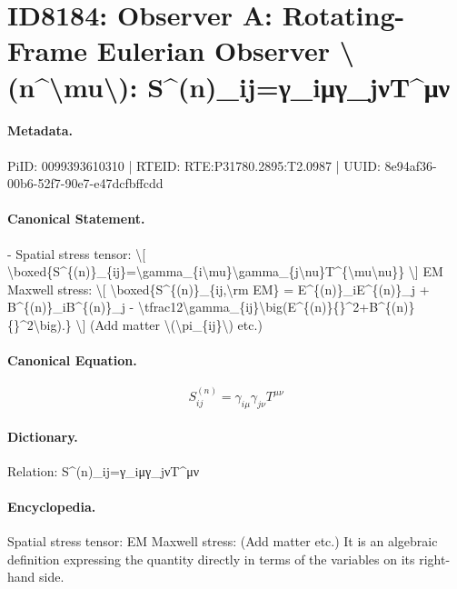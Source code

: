 \section*{ID8184: Observer A: Rotating-Frame Eulerian Observer \textbackslash{}(n\textasciicircum{}\textbackslash{}mu\textbackslash{}): S\textasciicircum{}(n)\_ij=γ\_iμγ\_jνT\textasciicircum{}μν}
\paragraph{Metadata.}
PiID: 0099393610310 | RTEID: RTE:P31780.2895:T2.0987 | UUID: 8e94af36-00b6-52f7-90e7-e47dcfbffcdd

\paragraph{Canonical Statement.}
- Spatial stress tensor: \textbackslash{}[ \textbackslash{}boxed\{S\textasciicircum{}\{(n)\}\_\{ij\}=\textbackslash{}gamma\_\{i\textbackslash{}mu\}\textbackslash{}gamma\_\{j\textbackslash{}nu\}T\textasciicircum{}\{\textbackslash{}mu\textbackslash{}nu\}\} \textbackslash{}] EM Maxwell stress: \textbackslash{}[ \textbackslash{}boxed\{S\textasciicircum{}\{(n)\}\_\{ij,\textbackslash{}rm EM\} = E\textasciicircum{}\{(n)\}\_iE\textasciicircum{}\{(n)\}\_j + B\textasciicircum{}\{(n)\}\_iB\textasciicircum{}\{(n)\}\_j - \textbackslash{}tfrac12\textbackslash{}gamma\_\{ij\}\textbackslash{}big(E\textasciicircum{}\{(n)\}\{\}\textasciicircum{}2+B\textasciicircum{}\{(n)\}\{\}\textasciicircum{}2\textbackslash{}big).\} \textbackslash{}] (Add matter \textbackslash{}(\textbackslash{}pi\_\{ij\}\textbackslash{}) etc.)

\paragraph{Canonical Equation.}
\[
\boxed{S^{(n)}_{ij}=\gamma_{i\mu}\gamma_{j\nu}T^{\mu\nu}}
\]

\paragraph{Dictionary.}
Relation: S\textasciicircum{}(n)\_ij=γ\_iμγ\_jνT\textasciicircum{}μν

\paragraph{Encyclopedia.}
Spatial stress tensor: EM Maxwell stress: (Add matter etc.) It is an algebraic definition expressing the quantity directly in terms of the variables on its right-hand side.
